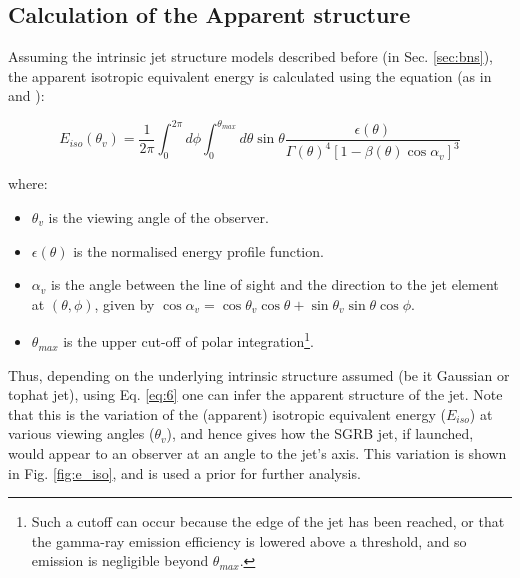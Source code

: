     \subsection{Calculation of the Apparent structure}

    Assuming the intrinsic jet structure models described before (in Sec.
    \ref{sec:bns}), the apparent isotropic equivalent energy is calculated using the
    equation (as in \cite{salafia_2015} and
    \cite{biscoveanu_2020}):

     \begin{equation}
         \label{eq:6}
         E_{iso}(\theta_v) =
             \dfrac{1}{2\pi}
             \int_{0}^{2\pi} d\phi \int_{0}^{\theta_{max}} d\theta
             \sin \theta
             \dfrac{\epsilon(\theta)}{\Gamma(\theta)^4
             [1 - \beta(\theta) \cos \alpha_v]^3}
     \end{equation}

    where:
    \begin{itemize}

        \item $\theta_v$ is the viewing angle of the observer.

        \item $\epsilon(\theta)$ is the normalised energy profile function.

        \item $\alpha_v$ is the angle between the line of sight and the direction to the
            jet element at $(\theta, \phi)$, given by $\cos \alpha_v = \cos \theta_v
            \cos \theta + \sin \theta_v \sin \theta \cos \phi$.

        \item $\theta_{max}$ is the upper cut-off of polar integration\footnote
            {
                Such a cutoff can occur because the edge of the jet has been reached, or
                that the gamma-ray emission efficiency is lowered above a threshold, and
                so emission is negligible beyond $\theta_{max}$.
            }.

    \end{itemize}

    Thus, depending on the underlying intrinsic structure assumed (be it Gaussian or
    tophat jet), using Eq. \ref{eq:6} one can infer the apparent structure of the jet.
    Note that this is the variation of the (apparent) isotropic equivalent energy
    ($E_{iso}$) at various viewing angles ($\theta_v$), and hence gives how the SGRB
    jet, if launched, would appear to an observer at an angle to the jet's axis. This
    variation is shown in Fig. \ref{fig:e_iso}, and is used a prior for further
    analysis.

